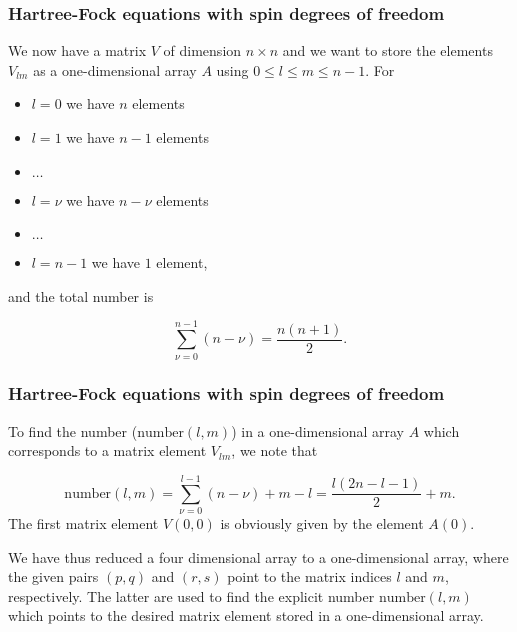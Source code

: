 \documentclass{beamer}
\begin{document}
\begin{frame}
\frametitle{Hartree-Fock equations with spin degrees of freedom}

\begin{block}{}

We now have a matrix $V$ of dimension $n\times n$ and we want to store the elements $V_{lm}$ as a one-dimensional array $A$ using
$0 \le l \le m \le n-1$. For

\begin{itemize}
  \item $l=0$ we have $n$ elements

  \item $l=1$ we have $n-1$ elements

  \item $\dots$

  \item $l=\nu$ we have $n-\nu$ elements

  \item $\dots$

  \item $l=n-1$ we have $1$ element,
\end{itemize}

\noindent
and the total number is

\begin{equation*}
\sum_{\nu =0}^{n-1}\left(n-\nu\right)=\frac{n(n+1)}{2}.
\end{equation*}
\end{block}
\end{frame}

\begin{frame}
\frametitle{Hartree-Fock equations with spin degrees of freedom}

\begin{block}{}

To find the number ($\mathrm{number}(l,m)$) in a one-dimensional array $A$ which corresponds to a matrix element $V_{lm}$, we note that

\begin{equation*}
\mathrm{number}(l,m)=\sum_{\nu =0}^{l-1}\left(n-\nu\right)+m-l=\frac{l(2n-l-1)}{2}+m.
\end{equation*}
The first matrix element $V(0,0)$ is obviously given by the element $A(0)$. 

We have thus reduced a four dimensional array to a one-dimensional array, where the given pairs $(p,q)$ and $(r,s)$ point to the matrix indices $l$
and $m$, respectively. The latter are used to find the explicit number $\mathrm{number}(l,m)$ which points to the desired matrix element stored 
in a one-dimensional array.
\end{block}
\end{frame}
\end{document}
